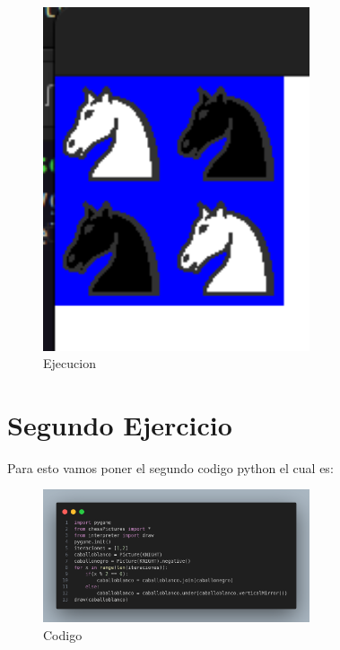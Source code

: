 \documentclass[10pt, a4paper]{article}
\begin{document}
\begin{figure}[H]
  \centering
  \includegraphics[width=0.7\textwidth]{img/Ejercicio1.png}
  \caption{Ejecucion}
\end{figure}

\section{Segundo Ejercicio}
Para esto vamos poner el segundo codigo python el cual es:  
\begin{figure}[H]
  \centering
  \includegraphics[width=0.7\textwidth]{img/Ej2.png}
  \caption{Codigo}
\end{figure}
\end{document}
